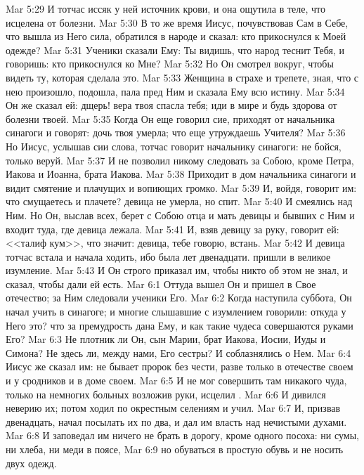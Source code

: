 \vs Mar 5:29 И тотчас иссяк у ней источник крови, и она ощутила в теле, что исцелена от болезни.
\vs Mar 5:30 В то же время Иисус, почувствовав Сам в Себе, что вышла из Него сила, обратился в народе и сказал: кто прикоснулся к Моей одежде?
\vs Mar 5:31 Ученики сказали Ему: Ты видишь, что народ теснит Тебя, и говоришь: кто прикоснулся ко Мне?
\vs Mar 5:32 Но Он смотрел вокруг, чтобы видеть ту, которая сделала это.
\vs Mar 5:33 Женщина в страхе и трепете, зная, что с нею произошло, подошла, пала пред Ним и сказала Ему всю истину.
\vs Mar 5:34 Он же сказал ей: дщерь! вера твоя спасла тебя; иди в мире и будь здорова от болезни твоей.
\rsbpar\vs Mar 5:35 Когда Он еще говорил сие, приходят от начальника синагоги и говорят: дочь твоя умерла; что еще утруждаешь Учителя?
\vs Mar 5:36 Но Иисус, услышав сии слова, тотчас говорит начальнику синагоги: не бойся, только веруй.
\vs Mar 5:37 И не позволил никому следовать за Собою, кроме Петра, Иакова и Иоанна, брата Иакова.
\vs Mar 5:38 Приходит в дом начальника синагоги и видит смятение и плачущих и вопиющих громко.
\vs Mar 5:39 И, войдя, говорит им: что смущаетесь и плачете? девица не умерла, но спит.
\vs Mar 5:40 И смеялись над Ним. Но Он, выслав всех, берет с Собою отца и мать девицы и бывших с Ним и входит туда, где девица лежала.
\vs Mar 5:41 И, взяв девицу за руку, говорит ей: <<талиф кум>>, что значит: девица, тебе говорю, встань.
\vs Mar 5:42 И девица тотчас встала и начала ходить, ибо была лет двенадцати.  пришли в великое изумление.
\vs Mar 5:43 И Он строго приказал им, чтобы никто об этом не знал, и сказал, чтобы дали ей есть.
\vs Mar 6:1 Оттуда вышел Он и пришел в Свое отечество; за Ним следовали ученики Его.
\vs Mar 6:2 Когда наступила суббота, Он начал учить в синагоге; и многие слышавшие с изумлением говорили: откуда у Него это? что за премудрость дана Ему, и как такие чудеса совершаются руками Его?
\vs Mar 6:3 Не плотник ли Он, сын Марии, брат Иакова, Иосии, Иуды и Симона? Не здесь ли, между нами, Его сестры? И соблазнялись о Нем.
\vs Mar 6:4 Иисус же сказал им: не бывает пророк без чести, разве только в отечестве своем и у сродников и в доме своем.
\vs Mar 6:5 И не мог совершить там никакого чуда, только на немногих больных возложив руки, исцелил .
\vs Mar 6:6 И дивился неверию их; потом ходил по окрестным селениям и учил.
\rsbpar\vs Mar 6:7 И, призвав двенадцать, начал посылать их по два, и дал им власть над нечистыми духами.
\vs Mar 6:8 И заповедал им ничего не брать в дорогу, кроме одного посоха: ни сумы, ни хлеба, ни меди в поясе,
\vs Mar 6:9 но обуваться в простую обувь и не носить двух одежд.
